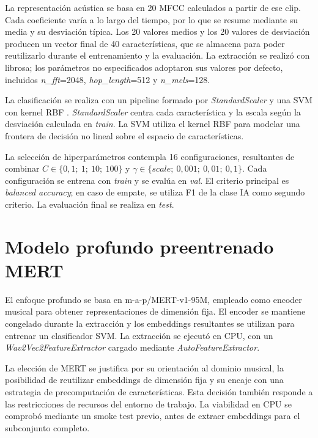La representación acústica se basa en 20 MFCC calculados a partir de ese clip. Cada coeficiente varía a lo largo del tiempo, por lo que se resume mediante su media y su desviación típica. Los 20 valores medios y los 20 valores de desviación producen un vector final de 40 características, que se almacena para poder reutilizarlo durante el entrenamiento y la evaluación. La extracción se realizó con librosa; los parámetros no especificados adoptaron sus valores por defecto, incluidos \textit{n\_fft}=2048, \textit{hop\_length}=512 y \textit{n\_mels}=128.

La clasificación se realiza con un pipeline formado por \textit{StandardScaler} y una SVM con kernel RBF \cite{cortes1995support}. \textit{StandardScaler} centra cada característica y la escala según la desviación calculada en \textit{train}. La SVM utiliza el kernel RBF para modelar una frontera de decisión no lineal sobre el espacio de características.

La selección de hiperparámetros contempla 16 configuraciones, resultantes de combinar $C \in \{0{,}1;\ 1;\ 10;\ 100\}$ y $\gamma \in \{\textit{scale};\ 0{,}001;\ 0{,}01;\ 0{,}1\}$. Cada configuración se entrena con \textit{train} y se evalúa en \textit{val}. El criterio principal es \textit{balanced accuracy}; en caso de empate, se utiliza F1 de la clase IA como segundo criterio. La evaluación final se realiza en \textit{test}.

\section{Modelo profundo preentrenado MERT}
\label{sec:mert-propuesta}

El enfoque profundo se basa en m-a-p/MERT-v1-95M, empleado como encoder musical para obtener representaciones de dimensión fija. El encoder se mantiene congelado durante la extracción y los embeddings resultantes se utilizan para entrenar un clasificador SVM. La extracción se ejecutó en CPU, con un \textit{Wav2Vec2FeatureExtractor} cargado mediante \textit{AutoFeatureExtractor}.

La elección de MERT se justifica por su orientación al dominio musical, la posibilidad de reutilizar embeddings de dimensión fija y su encaje con una estrategia de precomputación de características. Esta decisión también responde a las restricciones de recursos del entorno de trabajo. La viabilidad en CPU se comprobó mediante un smoke test previo, antes de extraer embeddings para el subconjunto completo.

